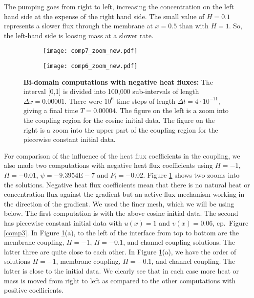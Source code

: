The pumping goes from right to left, increasing the concentration on the left hand side 
at the expense of the right hand side. 
The small value of $H=0.1$ represents a slower flux through the membrane
at $x=0.5$ than with $H=1$.
So, the left-hand side is loosing mass at a slower rate.

%
\begin{figure}
%
\begin{subfigure}{.49\textwidth}
  \centering
  \texttt{[image: comp7\_zoom\_new.pdf]}
  \caption{}
\end{subfigure}
%
\begin{subfigure}{.49\textwidth}
  \centering
  \texttt{[image: comp6\_zoom\_new.pdf]}
  \caption{}
\end{subfigure}
%
\caption{\textbf{Bi-domain computations with negative heat fluxes:} 
\label{comp5}
The interval [0,1] is divided into 100,000 sub-intervals of length $\Delta x=0.00001$. 
There were $10^6$ time steps of length $\Delta t=4\cdot 10^{-11}$, giving a final time $T=0.00004$. The figure on the left 
is a zoom into the coupling region for the cosine initial data.
The figure on the right is a zoom into the upper part of the coupling region
for the piecewise constant initial data.}
%
\end{figure}

For comparison of the influence of the heat flux coefficients in the coupling, 
we also made two computations with negative heat flux coefficients using $H=-1$, $H=-0.01$, $\psi = -9.3954\text{E}-7$
and $P_l=-0.02$. Figure \ref{comp5} shows two zooms into the solutions.
Negative heat flux coefficients mean that there is no natural heat or concentration flux 
against the gradient but an active flux mechanism working
in the direction of the gradient. We used the finer mesh, which we will be using below. The first computation 
is with the above cosine initial data. The second has piecewise constant initial data
with $u(x)=1$ and $v(x)=0.06$, cp.\ Figure \ref{comp3}. In Figure \ref{comp5}(a), to the left of the interface from top
to bottom are the membrane coupling, $H=-1$, $H=-0.1$, and channel coupling solutions. The latter three are quite
close to each other. In Figure \ref{comp5}(a), we have the order of solutions $H=-1$, membrane coupling, $H=-0.1$, and channel
coupling. The latter is close to the initial data. We clearly see that in each case more heat or mass 
is moved from right to left as compared to the other computations with positive coefficients.

